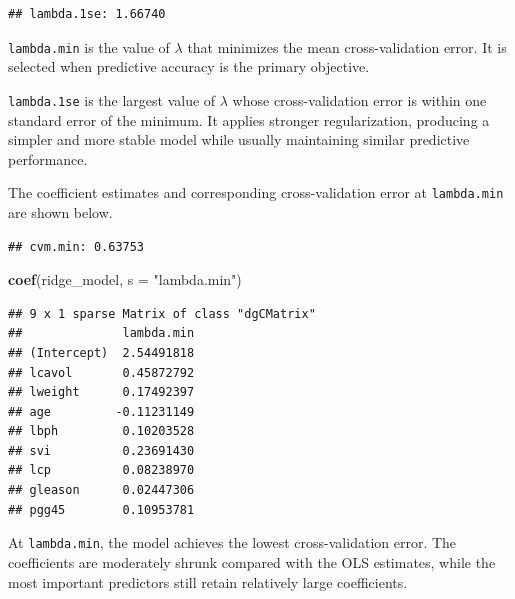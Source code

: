 \documentclass[
  11pt,
]{article}
\newenvironment{Shaded}{\begin{snugshade}}{\end{snugshade}}
\newcommand{\AttributeTok}[1]{\textcolor[rgb]{0.13,0.29,0.53}{#1}}
\newcommand{\FunctionTok}[1]{\textcolor[rgb]{0.13,0.29,0.53}{\textbf{#1}}}
\newcommand{\NormalTok}[1]{#1}
\newcommand{\OtherTok}[1]{\textcolor[rgb]{0.56,0.35,0.01}{#1}}
\newcommand{\SpecialCharTok}[1]{\textcolor[rgb]{0.81,0.36,0.00}{\textbf{#1}}}
\newcommand{\StringTok}[1]{\textcolor[rgb]{0.31,0.60,0.02}{#1}}
\begin{document}
\begin{verbatim}
## lambda.1se: 1.66740
\end{verbatim}

\texttt{lambda.min} is the value of \(\lambda\) that minimizes the mean
cross-validation error. It is selected when predictive accuracy is the
primary objective.

\texttt{lambda.1se} is the largest value of \(\lambda\) whose
cross-validation error is within one standard error of the minimum. It
applies stronger regularization, producing a simpler and more stable
model while usually maintaining similar predictive performance.

The coefficient estimates and corresponding cross-validation error at
\texttt{lambda.min} are shown below.

\begin{Shaded}
\end{Shaded}

\begin{verbatim}
## cvm.min: 0.63753
\end{verbatim}

\begin{Shaded}
\begin{Highlighting}[]
\FunctionTok{coef}\NormalTok{(ridge\_model, }\AttributeTok{s =} \StringTok{"lambda.min"}\NormalTok{)}
\end{Highlighting}
\end{Shaded}

\begin{verbatim}
## 9 x 1 sparse Matrix of class "dgCMatrix"
##              lambda.min
## (Intercept)  2.54491818
## lcavol       0.45872792
## lweight      0.17492397
## age         -0.11231149
## lbph         0.10203528
## svi          0.23691430
## lcp          0.08238970
## gleason      0.02447306
## pgg45        0.10953781
\end{verbatim}

At \texttt{lambda.min}, the model achieves the lowest cross-validation
error. The coefficients are moderately shrunk compared with the OLS
estimates, while the most important predictors still retain relatively
large coefficients.
\end{document}
